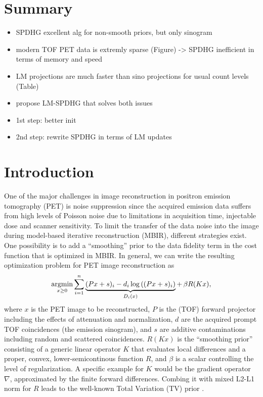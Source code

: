 \section*{Summary}

\begin{itemize}
\item SPDHG excellent alg for non-smooth priors, but only sinogram
\item modern TOF PET data is extremly sparse (Figure) -> SPDHG inefficient
      in terms of memory and speed
\item LM projections are much faster than sino projections for usual count levels
      (Table)
\item propose LM-SPDHG that solves both issues
\item 1st step: better init
\item 2nd step: rewrite SPDHG in terms of LM updates
\end{itemize}


\section{Introduction}

One of the major challenges in image reconstruction in positron emission tomography (PET)
is noise suppression since the acquired emission data suffers from high levels of Poisson
noise due to limitations in acquisition time, injectable dose and scanner sensitivity.
To limit the transfer of the data noise into the image during model-based iterative
reconstruction (MBIR), different strategies exist. 
One possibility is to add a ``smoothing'' prior to the data fidelity term in the cost
function that is optimized in MBIR.
In general, we can write the resulting optimization problem for PET image reconstruction as
%
\begin{equation}
\operatorname*{argmin} _{x\geq 0} \sum_{i=1}^{n} \underbrace{(Px + s)_i -  d_i \log \left( (Px + s)_i \right)}_{D_i(x)} + \, \beta R(Kx),
\label{eq:primal}
\end{equation}
%
where $x$ is the PET image to be reconstructed, $P$ is the (TOF) forward projector including the effects
of attenuation and normalization, $d$ are the acquired prompt TOF coincidences (the emission sinogram),
and $s$ are additive contaminations including random and scattered coincidences. 
$R(Kx)$ is the ``smoothing prior'' consisting of a generic linear operator $K$ that evaluates 
local differences and a proper, convex, lower-semicontinous function $R$, and $\beta$ is a scalar controlling the level of regularization.
A specific example for $K$ would be the gradient operator $\nabla$, approximated by the finite forward 
differences. 
Combing it with mixed L2-L1 norm for $R$ leads to the well-known Total Variation (TV) prior 
\cite{Rudin1992}.

